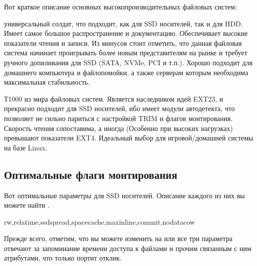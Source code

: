 \documentclass[letterpaper,10pt,russian,openany]{sphinxmanual}
\begin{document}
\sphinxAtStartPar
Вот краткое описание основных высокопроизводительных файловых систем:

\sphinxAtStartPar
{} \sphinxhyphen{} универсальный солдат, что подходит, как для SSD носителей, так и для HDD. Имеет самое большое распространение и документацию.
Обеспечивает высокие показатели чтения и записи.
Из минусов стоит отметить, что данная файловая система начинает проигрывать более новым представителям на рынке и требует ручного допиливания для SSD
(SATA, NVMe, PCI и т.п.).
Хорошо подходит для домашнего компьютера и файлопомойки, а также серверам которым необходима максимальная стабильность.

\sphinxAtStartPar
{} \sphinxhyphen{} Т1000 из мира файловых систем.
Является наследником идей EXT2\sphinxhyphen{}3, и прекрасно подходит для SSD носителей,
ибо имеет модули автодетекта, что позволяет не сильно париться с настройкой TRIM и флагов монтирования.
Скорость чтения сопоставима, а иногда (Особенно при высоких нагрузках) превышают показатели EXT4.
Идеальный выбор для игровой/домашней системы на базе Linux.

\ignorespaces 

\subsection{Оптимальные флаги монтирования}
\label{\detokenize{source/file-systems:mount-options}}\label{\detokenize{source/file-systems:index-1}}\label{\detokenize{source/file-systems:id3}}
\sphinxAtStartPar
Вот оптимальные параметры для SSD носителей.
Описание каждого из них вы можете найти \sphinxhyphen{} .

\begin{sphinxVerbatim}[commandchars=\\\{\}]
rw,relatime,ssd\PYGZus{}spread,space\PYGZus{}cache,max\PYGZus{}inline,commit,nodatacow
\end{sphinxVerbatim}

\sphinxAtStartPar
Прежде всего, отметим, что вы можете изменить  на 
или  \sphinxhyphen{} все три параметра отвечают за запоминание времени доступа к файлами и прочим связанным с ним атрибутами, что только портит отклик.
\end{document}

